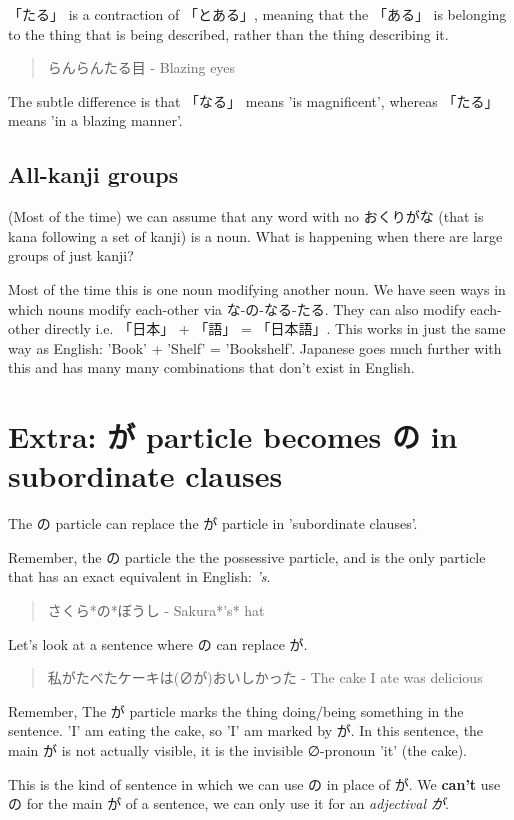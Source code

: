 \documentclass[11pt]{article}
\begin{document}
「たる」 is a contraction of 「とある」, meaning that the 「ある」 is belonging to the thing that is being described, rather than the thing describing it.
\begin{quote}
らんらんたる目 - Blazing eyes
\end{quote}
The subtle difference is that 「なる」 means 'is magnificent', whereas 「たる」 means 'in a blazing manner'.

\subsection{All-kanji groups}
\label{sec:org84922b8}
(Most of the time) we can assume that any word with no おくりがな (that is kana following a set of kanji) is a noun. What is happening when there are large groups of just kanji?

Most of the time this is one noun modifying another noun. We have seen ways in which nouns modify each-other via な-の-なる-たる. They can also modify each-other directly i.e. 「日本」 + 「語」 = 「日本語」. This works in just the same way as English: 'Book' + 'Shelf' = 'Bookshelf'. Japanese goes much further with this and has many many combinations that don't exist in English.

\section{Extra: が particle becomes の in subordinate clauses}
\label{sec:orgd207537}
The の particle can replace the が particle in 'subordinate clauses'.

Remember, the の particle the the possessive particle, and is the only particle that has an exact equivalent in English: \emph{'s}.
\begin{quote}
さくら*の*ぼうし - Sakura*'s* hat
\end{quote}

Let's look at a sentence where の can replace が.
\begin{quote}
私がたべたケーキは(∅が)おいしかった - The cake I ate was delicious
\end{quote}
Remember, The が particle marks the thing doing/being something in the sentence. 'I' am eating the cake, so 'I' am marked by が. In this sentence, the main が is not actually visible, it is the invisible ∅-pronoun 'it' (the cake).

This is the kind of sentence in which we can use の in place of が. We \textbf{can't} use の for the main が of a sentence, we can only use it for an \emph{adjectival が}.
\end{document}

